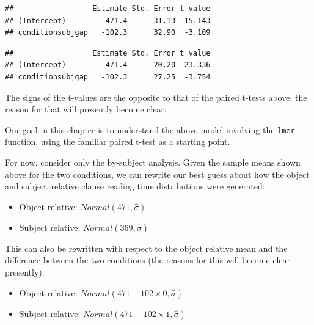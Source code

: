 \documentclass[12pt,]{krantz}
\newenvironment{Shaded}{\begin{snugshade}}{\end{snugshade}}
\newcommand{\DecValTok}[1]{\textcolor[rgb]{0.00,0.00,0.81}{#1}}
\newcommand{\KeywordTok}[1]{\textcolor[rgb]{0.13,0.29,0.53}{\textbf{#1}}}
\newcommand{\NormalTok}[1]{#1}
\newcommand{\OperatorTok}[1]{\textcolor[rgb]{0.81,0.36,0.00}{\textbf{#1}}}
\newcommand{\StringTok}[1]{\textcolor[rgb]{0.31,0.60,0.02}{#1}}
\providecommand{\tightlist}{%
  \setlength{\itemsep}{0pt}\setlength{\parskip}{0pt}}
\begin{document}
\begin{verbatim}
##                  Estimate Std. Error t value
## (Intercept)         471.4      31.13  15.143
## conditionsubjgap   -102.3      32.90  -3.109
\end{verbatim}

\begin{Shaded}
\end{Shaded}

\begin{verbatim}
##                  Estimate Std. Error t value
## (Intercept)         471.4      20.20  23.336
## conditionsubjgap   -102.3      27.25  -3.754
\end{verbatim}

The signs of the t-values are the opposite to that of the paired t-tests above; the reason for that will presently become clear.

Our goal in this chapter is to understand the above model involving the \texttt{lmer} function, using the familiar paired t-test as a starting point.

For now, consider only the by-subject analysis.
Given the sample means shown above for the two conditions,
we can rewrite our best guess about how the object and subject relative clause reading time distributions were generated:

\begin{itemize}
\tightlist
\item
  Object relative: \(Normal(471,\hat\sigma)\)
\item
  Subject relative: \(Normal(369,\hat\sigma)\)
\end{itemize}

This can also be rewritten with respect to the object relative mean and the difference between the two conditions (the reasons for this will become clear presently):

\begin{itemize}
\tightlist
\item
  Object relative: \(Normal(471-102\times 0,\hat\sigma)\)
\item
  Subject relative: \(Normal(471-102\times 1,\hat\sigma)\)
\end{itemize}
\end{document}
